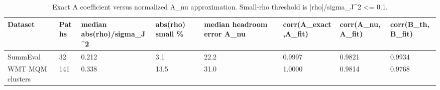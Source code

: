 \begin{table}[t]
\centering
\small
\begin{tabular}{llllllll}
\toprule
Dataset & Paths & median abs(rho)/sigma\_J\textasciicircum{}2 & abs(rho) small \% & median headroom error A\_nu & corr(A\_exact,A\_fit) & corr(A\_nu,A\_fit) & corr(B\_th,B\_fit) \\
\midrule
SummEval & 32 & 0.212 & 3.1 & 22.2 & 0.9997 & 0.9821 & 0.9934 \\
WMT MQM clusters & 141 & 0.338 & 13.5 & 31.0 & 1.0000 & 0.9814 & 0.9768 \\
\bottomrule
\end{tabular}
\vspace{0.25em}
\caption{Exact A coefficient versus normalized A\_nu approximation. Small-rho threshold is |rho|/sigma\_J\textasciicircum{}2 <= 0.1.}
\label{tab:scaling-a-vs-nu}
\end{table}
